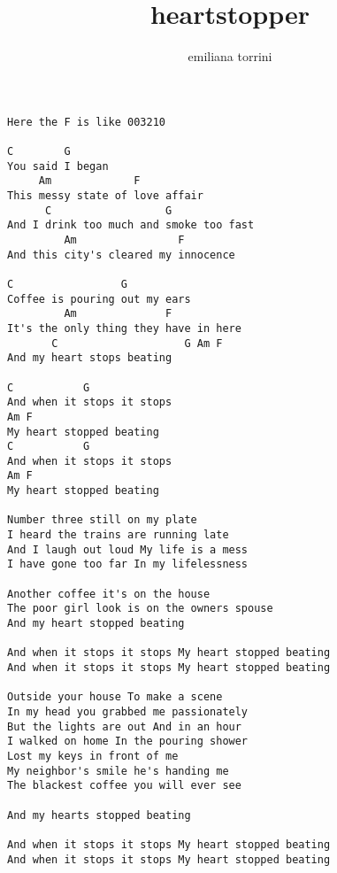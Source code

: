 \author{emiliana torrini}
\title{heartstopper}
\maketitle
\begin{verbatim}
Here the F is like 003210

C        G
You said I began
     Am             F
This messy state of love affair 
      C                  G
And I drink too much and smoke too fast 
         Am                F
And this city's cleared my innocence 

C                 G
Coffee is pouring out my ears 
         Am              F
It's the only thing they have in here
       C                    G Am F 
And my heart stops beating 

C           G
And when it stops it stops 
Am F
My heart stopped beating 
C           G
And when it stops it stops 
Am F
My heart stopped beating 

Number three still on my plate 
I heard the trains are running late 
And I laugh out loud My life is a mess 
I have gone too far In my lifelessness 

Another coffee it's on the house 
The poor girl look is on the owners spouse 
And my heart stopped beating 

And when it stops it stops My heart stopped beating 
And when it stops it stops My heart stopped beating 

Outside your house To make a scene 
In my head you grabbed me passionately 
But the lights are out And in an hour
I walked on home In the pouring shower 
Lost my keys in front of me 
My neighbor's smile he's handing me 
The blackest coffee you will ever see 

And my hearts stopped beating 

And when it stops it stops My heart stopped beating 
And when it stops it stops My heart stopped beating
\end{verbatim}